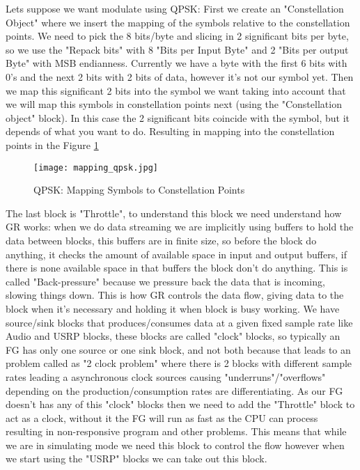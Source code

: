 \documentclass[a4paper, 10pt, conference]{ieeeconf}      %
\begin{document}
    Lets suppose we want modulate using QPSK: 
        First we create an "Constellation Object" where we insert the mapping of the symbols relative to the constellation points. 
        We need to pick the 8 bits/byte and slicing in 2 significant bits per byte, so we use the "Repack bits" with 8 "Bits per Input Byte" and 2 "Bits per output Byte" with MSB endianness. Currently we have a byte with the first 6 bits with 0's and the next 2 bits with 2 bits of data, however it's not our symbol yet.
        Then we map this significant 2 bits into the symbol we want taking into account that we will map this symbols in constellation points next (using the "Constellation object" block). In this case the 2 significant bits coincide with the symbol, but it depends of what you want to do.
        Resulting in mapping into the constellation points in the Figure   \ref{fig:mapping_qpsk}
        \begin{figure}
            \centering
            \texttt{[image: mapping\_qpsk.jpg]}
            \caption{QPSK: Mapping Symbols to Constellation Points}
            \label{fig:mapping_qpsk}
        \end{figure}
        
        The last block is "Throttle", to understand this block we need understand how GR works: when we do data streaming we are implicitly using buffers to hold the data between blocks, this buffers are in finite size, so before the block do anything, it checks the amount of available space in input and output buffers, if there is none available space in that buffers the block don't do anything. This is called "Back-pressure" because we pressure back the data that is incoming, slowing things down. This is how GR controls the data flow, giving data to the block when it's necessary and holding it when block is busy working. We have source/sink blocks that produces/consumes data at a given fixed sample rate like Audio and USRP blocks, these blocks are called "clock" blocks, so typically an FG has only one source or one sink block, and not both because that leads to an problem called as "2 clock problem" where there is 2 blocks with different sample rates leading a asynchronous clock sources causing "underruns"/"overflows" depending on the production/consumption rates are differentiating. As our FG doesn't has any of this "clock" blocks then we need to add the "Throttle" block to act as a clock, without it the FG will run as fast as the CPU can process resulting in non-responsive program and other problems. This means that while we are in simulating mode we need this block to control the flow however when we start using the "USRP" blocks we can take out this block.
        
\end{document}
